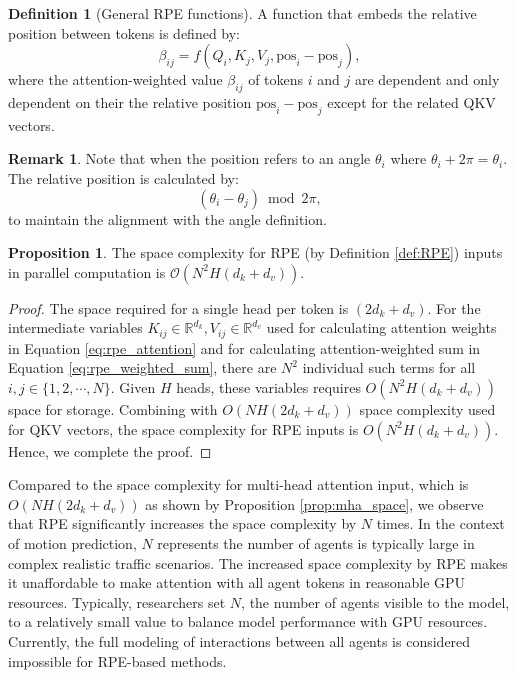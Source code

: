 \documentclass[lettersize,journal]{IEEEtran}
\theoremstyle{definition}
\newtheorem{proposition}{Proposition}
\newtheorem{definition}{Definition}
\newtheorem{remark}{Remark}
\begin{document}
\begin{definition}[General RPE functions]
    A function that embeds the relative position between tokens is defined by:
    \begin{equation}
    \beta_{ij} = f(Q_i,K_j,V_j,\text{pos}_i - \text{pos}_j),
    \label{eq:general_RPE_functions}
\end{equation}
where the attention-weighted value $\beta_{ij}$ of tokens $i$ and $j$ are dependent and only dependent on their the relative position $\text{pos}_i - \text{pos}_j$ except for the related QKV vectors.
\label{def:general_RPE_functions}
\end{definition}

\begin{remark}
\label{remark:rpe_relative_position}
Note that when the position refers to an angle $\theta_i$ where $\theta_i + 2\pi = \theta_i$.
The relative position is calculated by:
\begin{equation}
    (\theta_i - \theta_j) \bmod 2\pi,
\end{equation}
to maintain the alignment with the angle definition.
\end{remark}

\begin{proposition}
\label{prop:mha_rpe_space}
The space complexity for RPE (by Definition \ref{def:RPE}) inputs  in parallel computation is \(\mathcal{O}(N^2H(d_k+d_v))\).
\end{proposition}

\begin{proof}
The space required for a single head per token is $(2d_k + d_v)$. 
For the intermediate variables $K_{ij}\in \mathbb{R}^{d_k},V_{ij}\in \mathbb{R}^{d_v}$ used for calculating attention weights in Equation \eqref{eq:rpe_attention} and for calculating attention-weighted sum in Equation \eqref{eq:rpe_weighted_sum}, there are $N^2$ individual such terms for all $i,j\in\{1,2,\cdots,N\}$.
Given $H$ heads, these variables requires $O(N^2H(d_k+d_v))$ space for storage.
Combining with $O(NH(2d_k+d_v))$ space complexity used for QKV vectors, the space complexity for RPE inputs is $O(N^2H(d_k+d_v))$.
Hence, we complete the proof.
\end{proof}

Compared to the space complexity for multi-head attention input, which is $O(NH(2d_k+d_v))$ as shown by Proposition \ref{prop:mha_space}, we observe that RPE significantly increases the space complexity by $N$ times. In the context of motion prediction, $N$ represents the number of agents is typically large in complex realistic traffic scenarios. The increased space complexity by RPE makes it unaffordable to make attention with all agent tokens in reasonable GPU resources. Typically, researchers set $N$, the number of agents visible to the model, to a relatively small value to balance model performance with GPU resources.
Currently, the full modeling of interactions between all agents is considered impossible for RPE-based methods.
\end{document}
